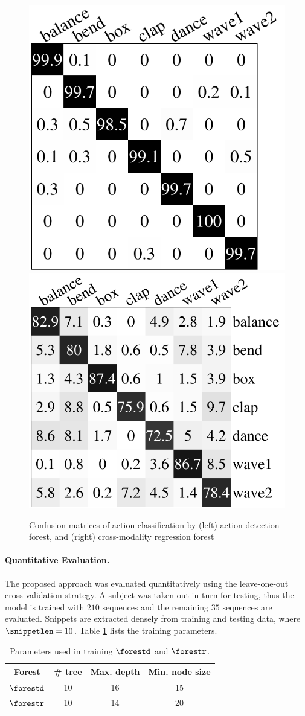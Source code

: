 \begin{figure}[ht]
	\centering
	\includegraphics[height=0.30\linewidth]{fig/body/confm_detection.pdf} \hspace{1cm} 
	\includegraphics[height=0.30\linewidth]{fig/body/confm_regression.pdf}
	\caption{Confusion matrices of action classification by (left) action detection forest, and (right) cross-modality regression forest} 
	\label{fig/body/confm}
\end{figure}

\paragraph{Quantitative Evaluation.}
\label{sec/body/quant}
The proposed approach was evaluated quantitatively using the leave-one-out cross-validation strategy. A subject was taken out in turn for testing, thus the model is trained with $210$ sequences and the remaining $35$ sequences are evaluated. 
Snippets are extracted densely from training and testing data, where $\snippetlen = 10$. 
Table \ref{tab/body/rf_train_params} lists the training parameters. 

\begin{table}
	\centering
	\begin{tabular}{|c|c|c|c|}
		\hline 
		Forest & \# tree & Max. depth & Min. node size \\ \hline 
		$\forestd$ & 10 & 16 & 15 \\ \hline 
		$\forestr$ & 10 & 14 & 20 \\ \hline 
	\end{tabular} 
	\caption{Parameters used in training $\forestd$ and $\forestr$.}
	\label{tab/body/rf_train_params}
\end{table}


